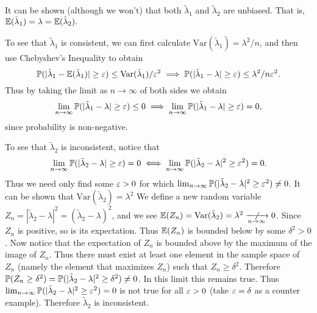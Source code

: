 It can be shown (although we won't) that both $\tilde{\lambda}_1$ and $\tilde{\lambda}_2$ are unbiased. That is, $\E(\tilde{\lambda}_1)=
\lambda=\E(\tilde{\lambda}_2).$

\bigskip

To see that $\tilde{\lambda}_1$ is consistent, we can first calculate $\text{Var}(\tilde{\lambda}_1)=\lambda^2/n$, and then
use Chebyshev's Inequality to obtain 
\[\P(|\tilde{\lambda}_1-\E(\tilde{\lambda}_1)|\geq\ep)\leq\text{Var}(\tilde{\lambda}_1)/\ep^2 \implies
\P(|\tilde{\lambda}_1-\lambda|\geq\ep)\leq \lambda^2/n\ep^2.\] Thus by taking the limit as $n\to\infty$ of both sides we obtain
\[\lim_{n\to\infty}\P(|\tilde{\lambda}_1-\lambda|\geq\ep)\leq 0\implies\lim_{n\to\infty}\P(|\tilde{\lambda}_1-\lambda|\geq\ep)
=0,\] since probability is non-negative.

\bigskip

To see that $\tilde{\lambda}_2$ is inconsistent, notice that \[\lim_{n\to\infty}\P(|\tilde{\lambda}_2-\lambda|\geq \ep)=0\iff
\lim_{n\to\infty}\P(|\tilde{\lambda}_2-\lambda|^2\geq \ep^2)=0.\] Thus we need only find some $\ep>0$ for which
$\lim_{n\to\infty}\P(|\tilde{\lambda}_2-\lambda|^2\geq \ep^2)\neq0$. It can be shown that
$\text{Var}(\tilde{\lambda}_2)=\lambda^2$ We define a new random variable $Z_n=|\tilde{\lambda}_2-\lambda|^2=
(\tilde{\lambda}_2-\lambda)^2$, and we see $\E(Z_n)=\text{Var}(\tilde{\lambda}_2)= \lambda^2\centernot{\xrightarrow[n\to\infty]{}}
0$. Since $Z_n$ is positive, so is its expectation. Thus $\E(Z_n)$ is bounded below by some $\delta^2>0$. Now notice that the
expectation of $Z_n$ is bounded above by the maximum of the image of $Z_n$. Thus there must exist at least one element in the
sample space of $Z_n$ (namely the element that maximizes $Z_n$) such that $Z_n \geq \delta^2$. Therefore $\P(Z_n\geq
\delta^2)=\P(|\tilde{\lambda}_2-\lambda|^2\geq \delta^2)\neq 0$. In this limit this remains true. Thus
$\lim_{n\to\infty}\P(|\tilde{\lambda}_2-\lambda|^2\geq \ep^2)=0$ is not true for all $\ep>0$ (take $\ep=\delta$ as a counter
example). Therefore $\tilde{\lambda}_2$ is inconsistent.


